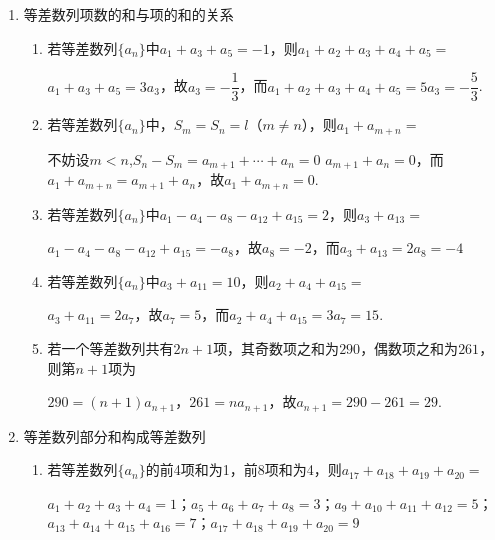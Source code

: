 \begin{enumerate}
\begin{enumerate}
\begin{jieda}
        \end{jieda}
    \end{enumerate}
    \item 等差数列项数的和与项的和的关系
    \begin{enumerate}
        \item 若等差数列$\{a_n\}$中$a_1 + a_3 + a_5 = -1$，则$a_1 + a_2 + a_3 + a_4 + a_5 = $
        \begin{jieda}
            $a_1 + a_3 + a_5 = 3a_3$，故$a_3 = -\dfrac{1}{3}$，而$a_1 + a_2 + a_3 + a_4 + a_5 = 5a_3 = -\dfrac{5}{3}$.
        \end{jieda}
        \item 若等差数列$\{a_n\}$中，$S_m = S_n = l$（$m \neq n$），则$a_1 + a_{m+n} = $
        \begin{jieda}
            不妨设$m<n$,$S_n-S_m = a_{m+1}+\cdots+a_n = 0$
            $a_{m+1} + a_n = 0$，而$a_1 + a_{m+n} = a_{m+1} + a_n$，故$a_1 + a_{m+n} = 0$.
        \end{jieda}
        \item 若等差数列$\{a_n\}$中$a_1 - a_4 - a_8 - a_{12} + a_{15} = 2$，则$a_3 + a_{13} = $
        \begin{jieda}
            $a_1 - a_4 - a_8 - a_{12} + a_{15} = -a_8$，故$a_8 = -2$，而$a_3 + a_{13} = 2a_8 = -4$
        \end{jieda}
        \item 若等差数列$\{a_n\}$中$a_3 + a_{11} = 10$，则$a_2 + a_4 + a_{15} = $
        \begin{jieda}
            $a_3 + a_{11} = 2a_7$，故$a_7 = 5$，而$a_2 + a_4 + a_{15} = 3a_7 = 15$.
        \end{jieda}
        \item 若一个等差数列共有$2n+1$项，其奇数项之和为$290$，偶数项之和为$261$，则第$n+1$项为
        \begin{jieda}
            $290 = (n+1)a_{n+1}$，$261 = na_{n+1}$，故$a_{n+1} = 290 - 261 = 29$.
        \end{jieda}
    \end{enumerate}
    \item 等差数列部分和构成等差数列
    \begin{enumerate}
        \item 若等差数列$\{a_n\}$的前4项和为1，前8项和为4，则$a_{17} + a_{18} +a_{19} +a_{20} = $
        \begin{jieda}
            $a_{1} + a_{2} +a_{3} +a_{4} = 1$；$a_{5} + a_{6} +a_{7} +a_{8} = 3$；$a_{9} + a_{10} +a_{11} +a_{12} = 5$；$a_{13} + a_{14} +a_{15} +a_{16} = 7$；$a_{17} + a_{18} +a_{19} +a_{20} = 9$

\end{jieda}
\end{enumerate}
\end{enumerate}
